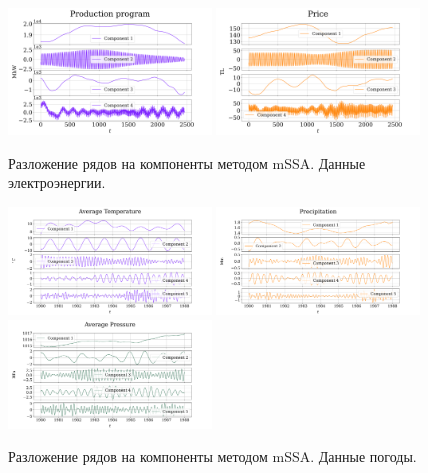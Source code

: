 			\begin{figure}[h!]
				\centering
				\includegraphics[width=0.48\textwidth, keepaspectratio]{../experiments/electricity/mssa/figs/decomposition/manual/grouping_1/Production_program.png}
				\includegraphics[width=0.48\textwidth, keepaspectratio]{../experiments/electricity/mssa/figs/decomposition/manual/grouping_1/Price.png}
				\caption{Разложение рядов на компоненты методом mSSA. Данные электроэнергии.}\label{fig:electr_decomp_mssa}
			\end{figure}
			
			\begin{figure}[h!]
				\centering
				\includegraphics[width=0.48\textwidth, keepaspectratio]{../experiments/weather/mssa/figs/decomposition/manual/grouping_1/Average_Temperature.png}
				\includegraphics[width=0.48\textwidth, keepaspectratio]{../experiments/weather/mssa/figs/decomposition/manual/grouping_1/Precipitation.png}
				\includegraphics[width=0.48\textwidth, keepaspectratio]{../experiments/weather/mssa/figs/decomposition/manual/grouping_1/Average_Pressure.png}
				\caption{Разложение рядов на компоненты методом mSSA. Данные погоды.}\label{fig:weather_decomp_mssa}
			\end{figure}
			
